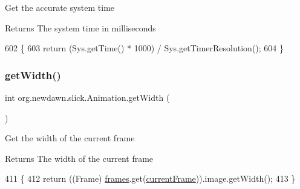 Get the accurate system time

\begin{DoxyReturn}{Returns}
The system time in milliseconds 
\end{DoxyReturn}

\begin{DoxyCode}
602                            \{
603         \textcolor{keywordflow}{return} (Sys.getTime() * 1000) / Sys.getTimerResolution();
604     \}
\end{DoxyCode}
\mbox{\label{classorg_1_1newdawn_1_1slick_1_1_animation_a98c530ffd6f3d78324fb7fdbf99e1575}} 
\subsubsection{\texorpdfstring{get\+Width()}{getWidth()}}
{\footnotesize\ttfamily int org.\+newdawn.\+slick.\+Animation.\+get\+Width (\begin{DoxyParamCaption}{ }\end{DoxyParamCaption})\hspace{0.3cm}{\ttfamily [inline]}}

Get the width of the current frame

\begin{DoxyReturn}{Returns}
The width of the current frame 
\end{DoxyReturn}

\begin{DoxyCode}
411                           \{
412         \textcolor{keywordflow}{return} ((Frame) \mbox{\hyperlink{classorg_1_1newdawn_1_1slick_1_1_animation_a39f0c6a16e479985b22f7dd3bb781bf7}{frames}}.get(\mbox{\hyperlink{classorg_1_1newdawn_1_1slick_1_1_animation_a358e1f2b9d9a05f83a416405e6bcd332}{currentFrame}})).image.getWidth();
413     \}
\end{DoxyCode}
\mbox{\label{classorg_1_1newdawn_1_1slick_1_1_animation_a1eed184d6fe5bef5731aaec8d95af56f}} 
